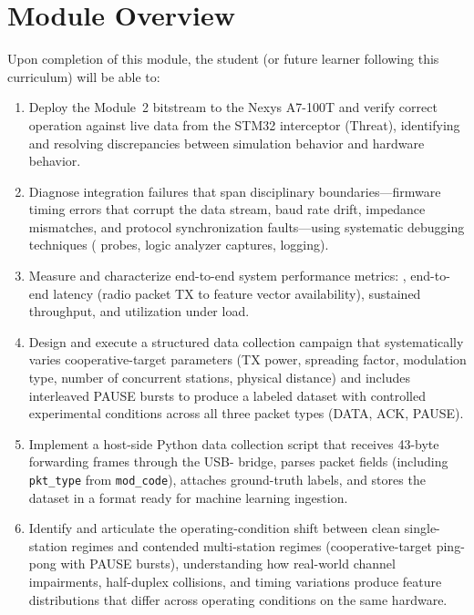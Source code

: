 \documentclass[11pt,letterpaper]{article}
\begin{document}
	\tableofcontents
	\newpage

	\section{Module Overview}

	\begin{tcolorbox}[objective={Module 3 Learning Objectives}]
		Upon completion of this module, the student (or future learner following this curriculum) will be able to:
		\begin{enumerate}[label=\textbf{LO-\arabic*}]
			\item Deploy the Module~2 \FPGA{} bitstream to the Nexys A7-100T and verify correct operation against live \UART{} data from the STM32 interceptor (Threat), identifying and resolving discrepancies between simulation behavior and hardware behavior.
			\item Diagnose integration failures that span disciplinary boundaries---firmware timing errors that corrupt the \FPGA{} data stream, baud rate drift, impedance mismatches, and protocol synchronization faults---using systematic debugging techniques (\ILA{} probes, logic analyzer captures, \UART{} logging).
			\item Measure and characterize end-to-end system performance metrics: \PER{}, end-to-end latency (radio packet TX to feature vector availability), sustained throughput, and \FIFO{} utilization under load.
			\item Design and execute a structured data collection campaign that systematically varies cooperative-target parameters (TX power, spreading factor, modulation type, number of concurrent stations, physical distance) and includes interleaved PAUSE bursts to produce a labeled \RF{} dataset with controlled experimental conditions across all three packet types (DATA, ACK, PAUSE).
			\item Implement a host-side Python data collection script that receives 43-byte forwarding frames through the \FPGA{} USB-\UART{} bridge, parses packet fields (including \texttt{pkt\_type} from \texttt{mod\_code}), attaches ground-truth labels, and stores the dataset in a format ready for machine learning ingestion.
			\item Identify and articulate the operating-condition shift between clean single-station regimes and contended multi-station regimes (cooperative-target ping-pong with PAUSE bursts), understanding how real-world channel impairments, half-duplex collisions, and timing variations produce feature distributions that differ across operating conditions on the same hardware.
		\end{enumerate}
	\end{tcolorbox}
\end{document}

